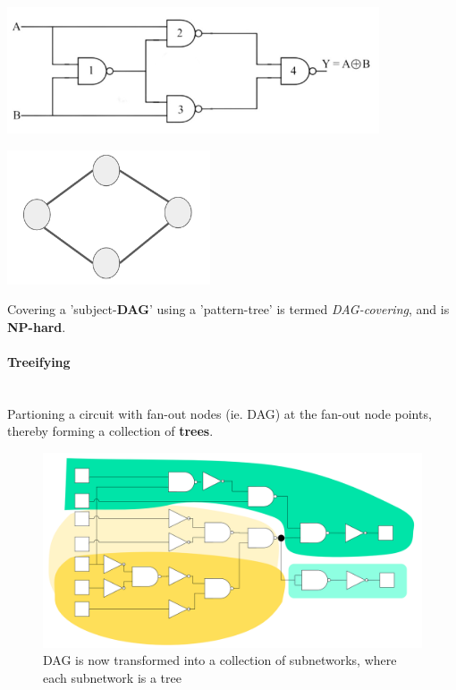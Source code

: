 \documentclass{article}
\begin{document}
\begin{minipage}[c]{0.5\textwidth}
    \centering
    \includegraphics[width=11cm, scale=1]{S4/xorGate.PNG}
    \captionsetup{justification=centering}
\end{minipage}%
\begin{minipage}[c]{0.5\textwidth}
    \centering
    \includegraphics[width=6cm, scale=1]{S6/xor_dag.PNG}
    \captionsetup{justification=centering}
\end{minipage}%

\vspace{0.5cm}
Covering a 'subject-\textbf{DAG}' using a 'pattern-tree' is termed \textit{DAG-covering}, and is \textbf{NP-hard}.

\paragraph{Treeifying}\mbox{}\\
Partioning a circuit with fan-out nodes (ie. DAG) at the fan-out node points, thereby forming a collection of \textbf{trees}.

\begin{figure}[htp]
    \centering
    \includegraphics[width=12cm, scale=1]{S3/partitionedGraph.PNG}
    \caption{DAG is now transformed into a collection of subnetworks, where each subnetwork is a tree}
\end{figure}
\end{document}
